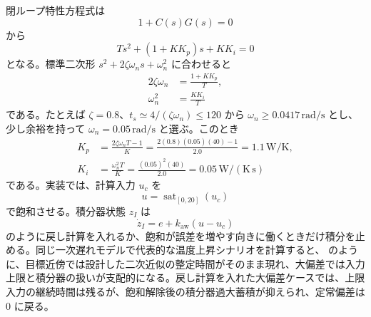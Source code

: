 閉ループ特性方程式は
\begin{equation}
  1+C(s)G(s)=0
\end{equation}
から
\begin{equation}
  Ts^2+(1+KK_p)s+KK_i=0
\end{equation}
となる。標準二次形 $s^2+2\zeta\omega_ns+\omega_n^2$ に合わせると
\begin{align}
  2\zeta\omega_n&=\frac{1+KK_p}{T},\\
  \omega_n^2&=\frac{KK_i}{T}
\end{align}
である。たとえば $\zeta=0.8$、$t_s\simeq4/(\zeta\omega_n)\le120$ から $\omega_n\ge0.0417\,\mathrm{rad/s}$ とし、少し余裕を持って $\omega_n=0.05\,\mathrm{rad/s}$ と選ぶ。このとき
\begin{align}
  K_p&=\frac{2\zeta\omega_nT-1}{K}
      =\frac{2(0.8)(0.05)(40)-1}{2.0}
      =1.1\,\mathrm{W/K},\\
  K_i&=\frac{\omega_n^2T}{K}
      =\frac{(0.05)^2(40)}{2.0}
      =0.05\,\mathrm{W/(K\,s)}
\end{align}
である。実装では、計算入力 $u_c$ を
\begin{equation}
  u=\operatorname{sat}_{[0,20]}(u_c)
\end{equation}
で飽和させる。積分器状態 $z_I$ は
\begin{equation}
  \dot{z}_I=e+k_{\mathrm{aw}}(u-u_c)
\end{equation}
のように戻し計算を入れるか、飽和が誤差を増やす向きに働くときだけ積分を止める。同じ一次遅れモデルで代表的な温度上昇シナリオを計算すると、 のように、目標近傍では設計した二次近似の整定時間がそのまま現れ、大偏差では入力上限と積分器の扱いが支配的になる。戻し計算を入れた大偏差ケースでは、上限入力の継続時間は残るが、飽和解除後の積分器過大蓄積が抑えられ、定常偏差は 0 に戻る。

